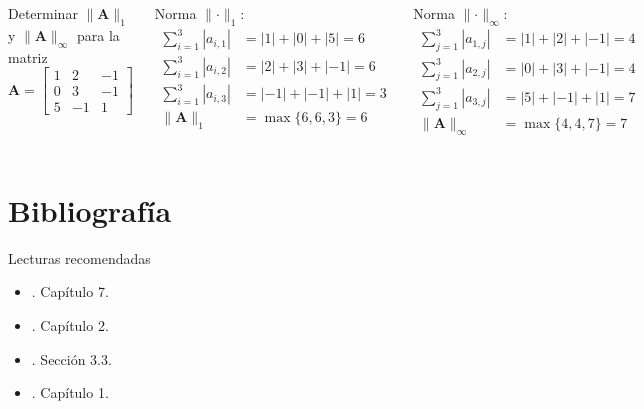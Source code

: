 \documentclass[9pt, aspectratio=169]{beamer}
\begin{document}
\begin{frame}
\begin{columns}[t]
\cx
Determinar $\lVert \bm{A} \rVert_{1}$ y $\lVert \bm{A} \rVert_{\infty}$ para la matriz
\[ \bm{A} = \begin{bmatrix}
    1 & 2 & -1 \\
    0 & 3 & -1 \\
    5 & -1 & 1
\end{bmatrix} \]

Norma $\lVert \cdot \rVert_1$:
\begin{align*}
    \sum_{i=1}^3 |a_{i,1}| &= |1| + |0| + |5| = 6 \\
    \sum_{i=1}^3 |a_{i,2}| &= |2| + |3| + |-1| = 6 \\
    \sum_{i=1}^3 |a_{i,3}| &= |-1| + |-1| + |1| = 3 \\
    \lVert \bm{A} \rVert_1 &= \max \{6, 6, 3\} = 6
\end{align*}

\cx
Norma $\lVert \cdot \rVert_{\infty}$:
\begin{align*}
    \sum_{j=1}^3 |a_{1,j}| &= |1| + |2| + |-1| = 4 \\
    \sum_{j=1}^3 |a_{2,j}| &= |0| + |3| + |-1| = 4 \\
    \sum_{j=1}^3 |a_{3,j}| &= |5| + |-1| + |1| = 7 \\
    \lVert \bm{A} \rVert_{\infty} &= \max \{4, 4, 7\} = 7
\end{align*}

\end{columns}
\end{frame}

\section*{Bibliografía}
\begin{frame}[allowframebreaks]{Lecturas recomendadas}
\begin{itemize}
    \item {}. Capítulo 7.
    \item {}. Capítulo 2.
    \item {}. Sección 3.3.
    \item {}. Capítulo 1.
\end{itemize}
\end{frame}
\end{document}
